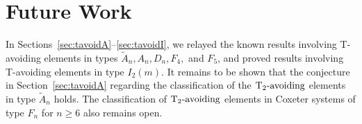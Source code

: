 %
%
%

\section{Future Work}\label{sec:open}
In Sections~\ref{sec:tavoidA}--\ref{sec:tavoidI}, we relayed the known results involving T-avoiding elements in types $\widetilde{A}_n, A_n, D_n, F_4,$ and $F_5$, and proved results involving T-avoiding elements in type $I_2(m)$. It remains to be shown that the conjecture in Section~\ref{sec:tavoidA} regarding the classification of the $\operatorname{T_2-\mathrm{avoiding}}$ elements in type $\widetilde{A}_n$ holds. The classification of $\operatorname{T_2-\mathrm{avoiding}}$ elements in Coxeter systems of type $F_n$ for $n \geq 6$ also remains open.

